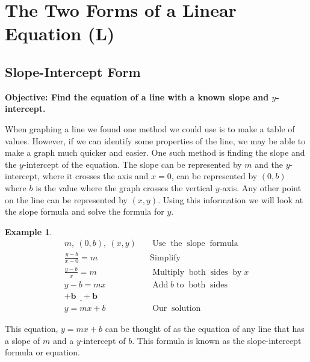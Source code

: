 \documentclass[12pt]{book}
\theoremstyle{definition}
\newtheorem{example}{Example}
\newcommand{\tmmathbf}[1]{\ensuremath{\boldsymbol{#1}}}
\newcommand{\tmop}[1]{\ensuremath{\operatorname{#1}}}
\begin{document}
\section{The Two Forms of a Linear Equation (L)}
\subsection{Slope-Intercept Form}
{\bf Objective: Find the equation of a line with a known slope and $y$-intercept.}\par
When graphing a line we found one method we could use is to make a table of values. However, if we can identify some properties of the line, we may be able to make a graph much quicker and easier. One such method is finding the slope and the $y$-intercept of the equation. The slope can be represented by $m$ and the $y$-intercept, where it crosses the axis and $x = 0$, can be represented by $(0, b)$ where $b$ is the value where the graph crosses the vertical $y$-axis. Any other point on the line can be represented by $(x, y)$. Using this information we will look at the slope formula and solve the formula for $y$.
\begin{example}\label{Lin55}
  \begin{eqnarray*}
    m,~ (0, b),~ (x, y) &  & \tmop{Use} \tmop{the} \tmop{slope} \tmop{formula}\\
    \frac{y - b}{x - 0} = m &  & \tmop{Simplify}\\
    \frac{y - b}{x} = m &  & \tmop{Multiply} \tmop{both} \tmop{sides}
    \tmop{by} x\\
    y - b = m x &  & \tmop{Add} b \tmop{to} \tmop{both} \tmop{sides}\\
    \tmmathbf{\underline{+ b ~~~+ b}} &  & \\
    y = m x + b &  & \tmop{Our} \tmop{solution}
  \end{eqnarray*}
\end{example}
This equation, $y = m x + b$ can be thought of as the equation of any line that has a slope of $m$ and a $y$-intercept of $b$. This formula is known as the slope-intercept formula or equation.\par
\begin{center}
\end{center}
\end{document}
